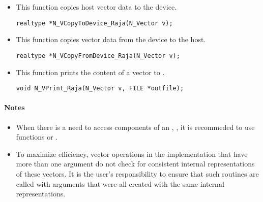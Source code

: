 \begin{itemize}
\item {}
 
 This function copies host vector data to the device.

 \verb|realtype *N_VCopyToDevice_Raja(N_Vector v);|



\item {}
 
 This function copies vector data from the device to the host.

 \verb|realtype *N_VCopyFromDevice_Raja(N_Vector v);|



\item {}
  
  This function prints the content of a {\raja} vector to .
 
    
  \verb|void N_VPrint_Raja(N_Vector v, FILE *outfile);|


\end{itemize}
\paragraph{\bf Notes} 
           
\begin{itemize}
                                        
\item
  When there is a need to access components of an , , 
  it is recommeded to use functions  or 
  .        
                                                               

\item
  {\warn}To maximize efficiency, vector operations in the {\nvecraja} implementation
  that have more than one  argument do not check for
  consistent internal representations of these vectors. It is the user's 
  responsibility to ensure that such routines are called with 
  arguments that were all created with the same internal representations.

\end{itemize}

